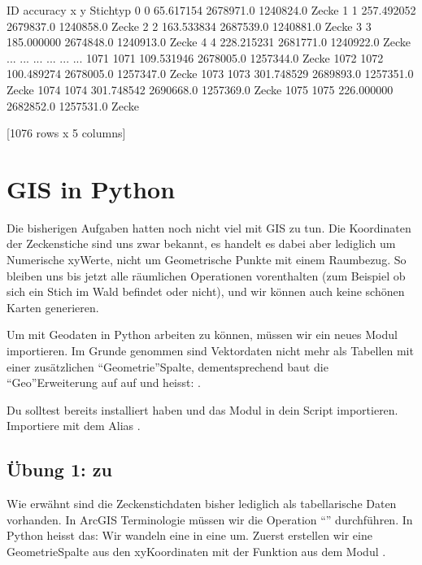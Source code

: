 \documentclass[letterpaper,10pt,english]{sphinxmanual}
\begin{document}
\begin{sphinxVerbatim}[commandchars=\\\{\}]
        ID    accuracy          x          y Stichtyp
0        0   65.617154  2678971.0  1240824.0    Zecke
1        1  257.492052  2679837.0  1240858.0    Zecke
2        2  163.533834  2687539.0  1240881.0    Zecke
3        3  185.000000  2674848.0  1240913.0    Zecke
4        4  228.215231  2681771.0  1240922.0    Zecke
...    ...         ...        ...        ...      ...
1071  1071  109.531946  2678005.0  1257344.0    Zecke
1072  1072  100.489274  2678005.0  1257347.0    Zecke
1073  1073  301.748529  2689893.0  1257351.0    Zecke
1074  1074  301.748542  2690668.0  1257369.0    Zecke
1075  1075  226.000000  2682852.0  1257531.0    Zecke

[1076 rows x 5 columns]
\end{sphinxVerbatim}


\chapter{GIS in Python}
\label{\detokenize{01_05_GIS_in_Python:gis-in-python}}\label{\detokenize{01_05_GIS_in_Python::doc}}
Die bisherigen Aufgaben hatten noch nicht viel mit GIS zu tun. Die Koordinaten der Zeckenstiche sind uns zwar bekannt, es handelt es dabei aber lediglich um Numerische xy\sphinxhyphen{}Werte, nicht um Geometrische Punkte mit einem Raumbezug. So bleiben uns bis jetzt alle räumlichen Operationen vorenthalten (zum Beispiel ob sich ein Stich im Wald befindet oder nicht), und wir können auch keine schönen Karten generieren.

Um mit Geodaten in Python arbeiten zu können, müssen wir ein neues Modul importieren. Im Grunde genommen sind Vektordaten nicht mehr als Tabellen mit einer zusätzlichen “Geometrie”\sphinxhyphen{}Spalte, dementsprechend baut die “Geo”\sphinxhyphen{}Erweiterung auf  auf und heisst: .

Du solltest  bereits installiert haben und das Modul in dein Script importieren. Importiere  mit dem Alias .


\section{Übung 1:  zu }
\label{\detokenize{01_05_GIS_in_Python:ubung-1-dataframe-zu-geodataframe}}
Wie erwähnt sind die Zeckenstichdaten bisher lediglich als tabellarische Daten vorhanden. In ArcGIS Terminologie müssen wir die Operation “” durchführen. In Python heisst das: Wir wandeln eine  in eine  um. Zuerst erstellen wir eine Geometrie\sphinxhyphen{}Spalte aus den xy\sphinxhyphen{}Koordinaten mit der Funktion  aus dem Modul .
\end{document}
